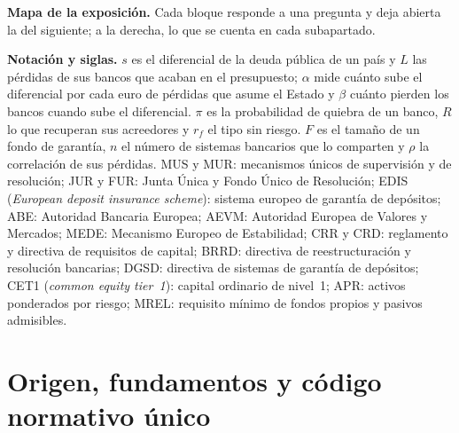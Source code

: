\documentclass[11pt]{article}
\begin{document}
\begin{anotaciones}
\textbf{Mapa de la exposición.} Cada bloque responde a una pregunta y deja abierta la del siguiente; a la derecha, lo que se cuenta en cada subapartado.
\begin{infografiacaja}
\caption{Mapa del tema: la pregunta de cada bloque y el hilo que los une}\label{figu:mapa-tema}
\end{infografiacaja}
\end{anotaciones}


\begin{anotaciones}
\textbf{Notación y siglas.} $s$ es el diferencial de la deuda pública de un país y $L$ las pérdidas de sus bancos que acaban en el presupuesto; $\alpha$ mide cuánto sube el diferencial por cada euro de pérdidas que asume el Estado y $\beta$ cuánto pierden los bancos cuando sube el diferencial. $\pi$ es la probabilidad de quiebra de un banco, $R$ lo que recuperan sus acreedores y $r_f$ el tipo sin riesgo. $F$ es el tamaño de un fondo de garantía, $n$ el número de sistemas bancarios que lo comparten y $\rho$ la correlación de sus pérdidas. MUS y MUR: mecanismos únicos de supervisión y de resolución; JUR y FUR: Junta Única y Fondo Único de Resolución; EDIS (\emph{European deposit insurance scheme}): sistema europeo de garantía de depósitos; ABE: Autoridad Bancaria Europea; AEVM: Autoridad Europea de Valores y Mercados; MEDE: Mecanismo Europeo de Estabilidad; CRR y CRD: reglamento y directiva de requisitos de capital; BRRD: directiva de reestructuración y resolución bancarias; DGSD: directiva de sistemas de garantía de depósitos; CET1 (\emph{common equity tier~1}): capital ordinario de nivel~1; APR: activos ponderados por riesgo; MREL: requisito mínimo de fondos propios y pasivos admisibles.
\end{anotaciones}

\section{Origen, fundamentos y\cortetitulo{} código normativo único}\label{sec:origen}
\end{document}
